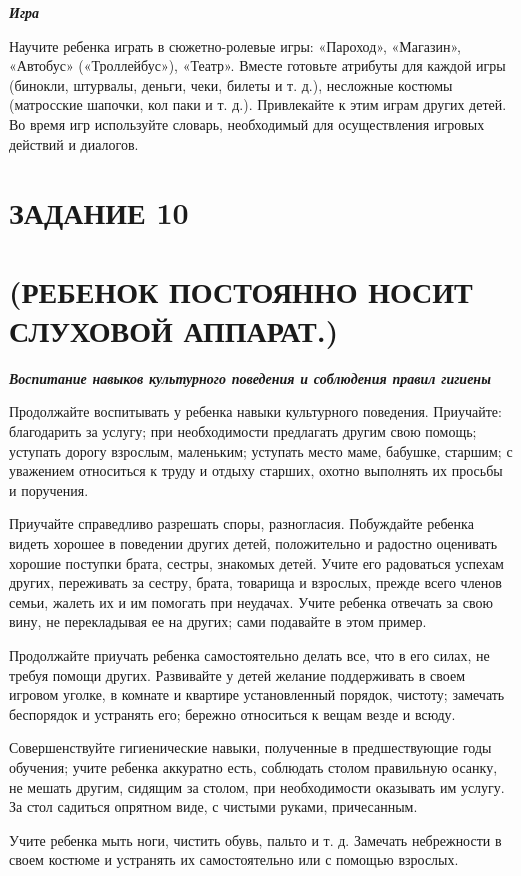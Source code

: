 \documentclass{book}
\renewcommand{\emph}[1]{\textit{#1}}
\begin{document}
\emph{\textbf{Игра}}

Научите ребенка играть в сюжетно-ролевые игры: «Пароход», «Магазин»,
«Автобус» («Троллейбус»), «Театр». Вместе готовьте атрибуты для каждой
игры (бинокли, штурвалы, деньги, чеки, билеты и т. д.), несложные
костюмы (матросские шапочки, кол паки и т. д.). Привлекайте к этим играм
других детей. Во время игр используйте словарь, необходимый для
осуществления игровых действий и диалогов.

\section{ЗАДАНИЕ 10}\section*{(РЕБЕНОК ПОСТОЯННО НОСИТ СЛУХОВОЙ АППАРАТ.)}

\textbf{\emph{Воспитание навыков культурного поведения и соблюдения
правил гигиены}}

Продолжайте воспитывать у ребенка навыки культурного поведения.
Приучайте: благодарить за услугу; при необходимости предлагать другим
свою помощь; уступать дорогу взрослым, маленьким; уступать место маме,
бабушке, старшим; с уважением относиться к труду и отдыху старших,
охотно выполнять их просьбы и поручения.

Приучайте справедливо разрешать споры, разногласия. Побуждайте ребенка
видеть хорошее в поведении других детей, положительно и радостно
оценивать хорошие поступки брата, сестры, знакомых детей. Учите его
радоваться успехам других, переживать за сестру, брата, товарища и
взрослых, прежде всего членов семьи, жалеть их и им помогать при
неудачах. Учите ребенка отвечать за свою вину, не перекладывая ее на
других; сами подавайте в этом пример.

Продолжайте приучать ребенка самостоятельно делать все, что в его силах,
не требуя помощи других. Развивайте у детей желание поддерживать в своем
игровом уголке, в комнате и квартире установленный порядок, чистоту;
замечать беспорядок и устранять его; бережно относиться к вещам везде и
всюду.

Совершенствуйте гигиенические навыки, полученные в предшествующие годы
обучения; учите ребенка аккуратно есть, соблюдать столом правильную
осанку, не мешать другим, сидящим за столом, при необходимости оказывать
им услугу. За стол садиться опрятном виде, с чистыми руками,
причесанным.

Учите ребенка мыть ноги, чистить обувь, пальто и т. д. Замечать
небрежности в своем костюме и устранять их самостоятельно или с помощью
взрослых.
\end{document}
